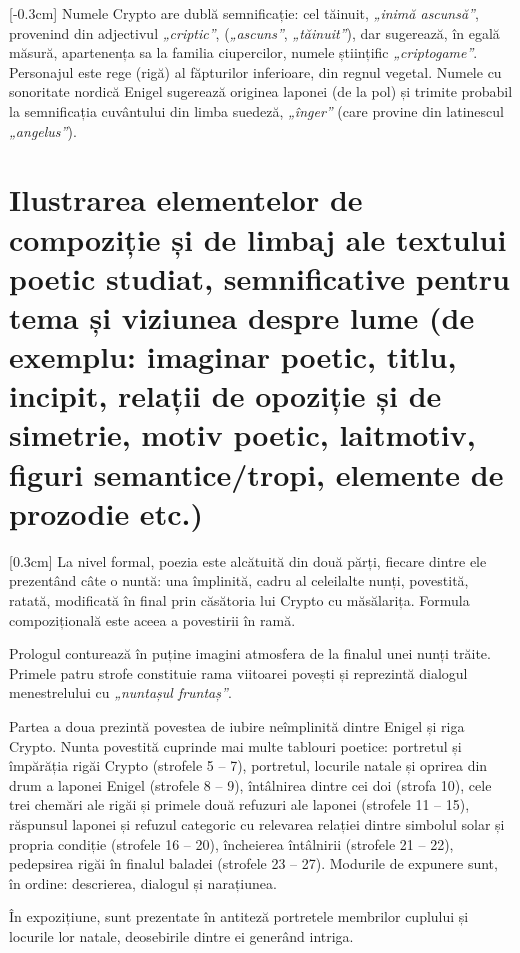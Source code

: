 [-0.3cm]
Numele Crypto are dublă semnificație: cel tăinuit, \textit{„inimă ascunsă”}, provenind din adjectivul \textit{„criptic”}, (\textit{„ascuns”}, \textit{„tăinuit”}), dar sugerează, în egală măsură, apartenența sa la familia ciupercilor, numele științific \textit{„criptogame”}. Personajul este rege (rigă) al făpturilor inferioare, din regnul vegetal. Numele cu sonoritate nordică Enigel sugerează originea laponei (de la pol) și trimite probabil la semnificația cuvântului din limba suedeză, \textit{„înger”} (care provine din latinescul \textit{„angelus”}).


\section{Ilustrarea elementelor de compoziție și de limbaj ale textului poetic studiat, semnificative pentru tema și viziunea despre lume {\footnotesize\normalfont(de exemplu: imaginar poetic, titlu, incipit, relații de opoziție și de simetrie, motiv poetic, laitmotiv, figuri semantice/tropi, elemente de prozodie etc.)}}

[0.3cm]
La nivel formal, poezia este alcătuită din două părți, fiecare dintre ele prezentând câte o nuntă: una împlinită, cadru al celeilalte nunți, povestită, ratată, modificată în final prin căsătoria lui Crypto cu măsălarița. Formula compozițională este aceea a povestirii în ramă.

Prologul conturează în puține imagini atmosfera de la finalul unei nunți trăite. Primele patru strofe constituie rama viitoarei povești și reprezintă dialogul menestrelului cu \textit{„nuntașul fruntaș”}.

Partea a doua prezintă povestea de iubire neîmplinită dintre Enigel și riga Crypto. Nunta povestită cuprinde mai multe tablouri poetice: portretul și împărăția rigăi Crypto (strofele 5 -- 7), portretul, locurile natale și oprirea din drum a laponei Enigel (strofele 8 -- 9), întâlnirea dintre cei doi (strofa 10), cele trei chemări ale rigăi și primele două refuzuri ale laponei (strofele 11 -- 15), răspunsul laponei și refuzul categoric cu relevarea relației dintre simbolul solar și propria condiție (strofele 16 -- 20), încheierea întâlnirii (strofele 21 -- 22), pedepsirea rigăi în finalul baladei (strofele 23 -- 27). Modurile de expunere sunt, în ordine: descrierea, dialogul și narațiunea.

În expozițiune, sunt prezentate în antiteză portretele membrilor cuplului și locurile lor natale, deosebirile dintre ei generând intriga.

